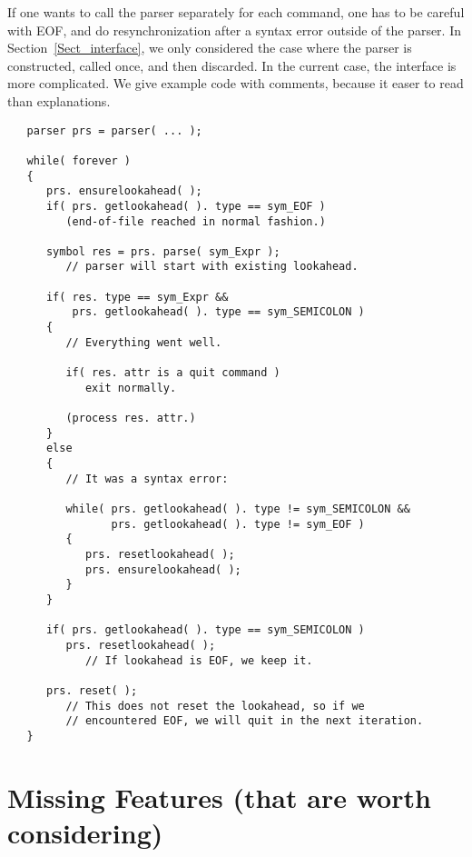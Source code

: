 \documentclass{article}
\begin{document}
If one wants to call the parser separately for each command, 
one has to be careful with EOF, and do resynchronization after a syntax
error outside of the parser. In Section~\ref{Sect_interface}, 
we only considered the case where the parser is constructed, 
called once, and then discarded.
In the current case, the interface is more complicated. We 
give example code with comments, because it easer to read than
explanations. 
\begin{verbatim}
   parser prs = parser( ... );
  
   while( forever ) 
   {
      prs. ensurelookahead( ); 
      if( prs. getlookahead( ). type == sym_EOF )
         (end-of-file reached in normal fashion.)

      symbol res = prs. parse( sym_Expr );
         // parser will start with existing lookahead.

      if( res. type == sym_Expr && 
          prs. getlookahead( ). type == sym_SEMICOLON )
      {
         // Everything went well. 

         if( res. attr is a quit command ) 
            exit normally. 

         (process res. attr.) 
      }
      else
      {
         // It was a syntax error: 
        
         while( prs. getlookahead( ). type != sym_SEMICOLON &&
                prs. getlookahead( ). type != sym_EOF )
         {
            prs. resetlookahead( );
            prs. ensurelookahead( );
         }
      }

      if( prs. getlookahead( ). type == sym_SEMICOLON )
         prs. resetlookahead( );
            // If lookahead is EOF, we keep it.

      prs. reset( );  
         // This does not reset the lookahead, so if we
         // encountered EOF, we will quit in the next iteration. 
   } 
\end{verbatim}
\section{Missing Features (that are worth considering)}
\end{document}
